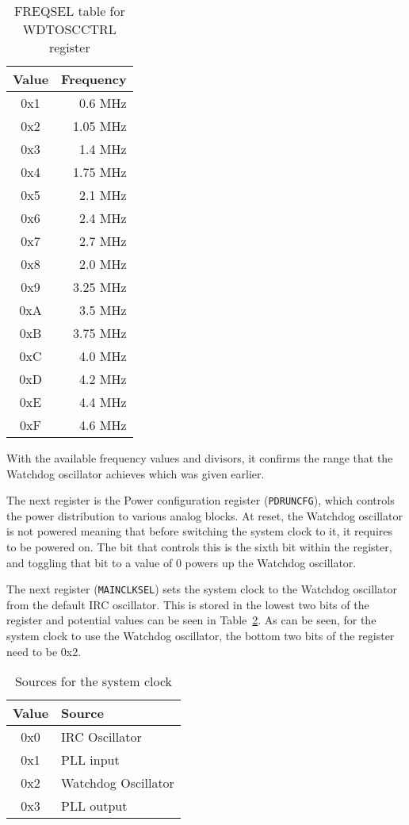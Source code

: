 \begin{table}
	\centering
	\begin{tabular}{|c|r|}
		\hline
		Value & Frequency \\
		\hline
		0x1 & 0.6 MHz \\
		0x2 & 1.05 MHz \\
		0x3 & 1.4 MHz \\
		0x4 & 1.75 MHz \\
		0x5 & 2.1 MHz \\
		0x6 & 2.4 MHz \\
		0x7 & 2.7 MHz \\
		0x8 & 2.0 MHz \\
		0x9 & 3.25 MHz \\
		0xA & 3.5 MHz \\
		0xB & 3.75 MHz \\
		0xC & 4.0 MHz \\
		0xD & 4.2 MHz \\
		0xE & 4.4 MHz \\
		0xF & 4.6 MHz \\
		\hline
	\end{tabular}
	\caption{FREQSEL table for WDTOSCCTRL register}
	\label{tab:freqsel}
\end{table}

With the available frequency values and divisors, it confirms the range that the Watchdog oscillator achieves which was given earlier.

The next register is the Power configuration register (\verb|PDRUNCFG|), which controls the power distribution to various analog blocks. At reset, the Watchdog oscillator is not powered meaning that before switching the system clock to it, it requires to be powered on. The bit that controls this is the sixth bit within the register, and toggling that bit to a value of 0 powers up the Watchdog oscillator. 

The next register (\verb|MAINCLKSEL|) sets the system clock to the Watchdog oscillator from the default IRC oscillator. This is stored in the lowest two bits of the register and potential values can be seen in Table~\ref{tab:sysclocksource}. As can be seen, for the system clock to use the Watchdog oscillator, the bottom two bits of the register need to be 0x2.

\begin{table}
	\centering
	\begin{tabular}{|c|l|}
		\hline
		Value & Source \\
		\hline
		0x0 & IRC Oscillator \\
		0x1 & PLL input \\
		0x2 & Watchdog Oscillator \\
		0x3 & PLL output \\
		\hline
	\end{tabular}
	\caption{Sources for the system clock}
	\label{tab:sysclocksource}
\end{table}

